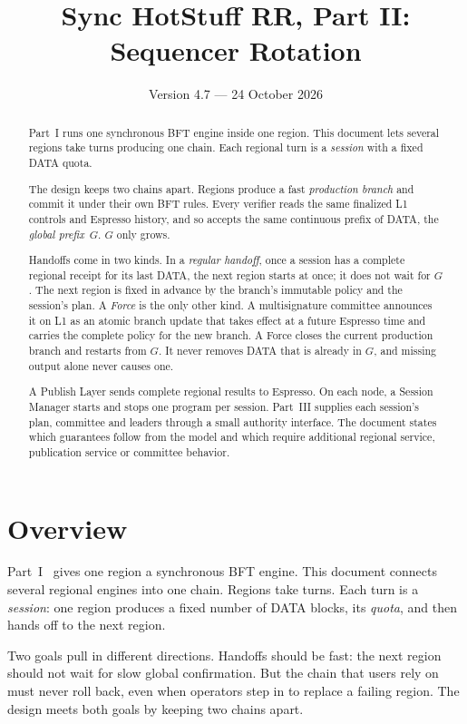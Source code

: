 \documentclass[11pt,a4paper]{article}
\title{Sync HotStuff RR, Part II: Sequencer Rotation}
\author{}\date{Version 4.7 --- 24 October 2026}
\newcommand{\defterm}[1]{\textcolor{rrBlue}{\textit{#1}}}
\begin{document}
\maketitle
\begin{abstract}
Part~I runs one synchronous BFT engine inside one region. This document
lets several regions take turns producing one chain. Each regional turn
is a \emph{session} with a fixed DATA quota.

The design keeps two chains apart. Regions produce a fast
\emph{production branch} and commit it under their own BFT rules.
Every verifier reads
the same finalized L1 controls and Espresso history, and so accepts the
same continuous prefix of DATA, the \emph{global prefix}~$G$. $G$ only
grows.

Handoffs come in two kinds. In a \emph{regular handoff}, once a session
has a complete regional receipt for its last DATA, the next region starts
at once; it does not wait for $G$. The next region is fixed in advance by
the branch's immutable policy and the session's plan. A \emph{Force} is
the only other kind. A multisignature committee announces it on L1 as an
atomic branch update that takes effect at a future Espresso time and
carries the complete policy for the new branch. A Force closes the
current production branch and restarts from $G$. It never removes DATA
that is already in $G$, and missing output alone never causes one.

A Publish Layer sends complete regional results to Espresso. On each
node, a Session Manager starts and stops one program per session.
Part~III supplies each session's plan, committee and leaders through a
small authority interface. The document states which guarantees follow
from the model and which require additional regional service,
publication service or committee behavior.
\end{abstract}

\section{Overview}
\label{sec:overview}
Part~I~\cite{part1} gives one region a synchronous BFT engine.
This document connects several regional engines into one chain. Regions
take turns. Each turn is a \defterm{session}: one region produces a fixed
number of DATA blocks, its \emph{quota}, and then hands off to the next
region.

Two goals pull in different directions. Handoffs should be fast: the next
region should not wait for slow global confirmation. But the chain that
users rely on must never roll back, even when operators step in to
replace a failing region. The design meets both goals by keeping two
chains apart.
\end{document}
